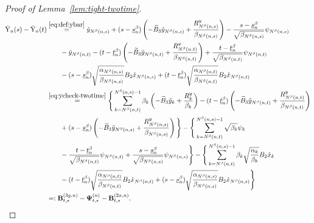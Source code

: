\documentclass[11pt]{article}
\theoremstyle{plain}
\theoremstyle{definition}
\newcommand{\xcheck}{{\check{x}}}
\newcommand{\ycheck}{{\check{y}}}
\newcommand{\ybar}{{\bar{\textnormal{Y}}}}
\newcommand{\ssum}[3]{\sum\limits_{{#1}={#2}}^{#3}}
\def\Psii{\mbox{\boldmath$\Psi$\unboldmath}}
\def\bfB{{\bf B}}
\begin{document}
\begin{appendix}
\begin{proof}[Proof of Lemma~\ref{lem:tight-twotime}]
\begin{align*}
    \ybar_{n}(s) - \ybar_{n}(t)
    & \overset{\eqref{eq:def:ybar}}{=} \ycheck_{N^\beta(n,s)} + (s - \underline{s}^\beta_{n} ) \left( - \widetilde{B}_3  \ycheck_{N^\beta(n,s)} + \frac{ R_{N^\beta(n,s)}^y }{ \beta_{N^\beta(n,s)} } \right) -  \frac{s - \underline{s}^\beta_{n}}{ \sqrt{ \beta_{N^\beta(n,s) } } }  
    \psi_{N^\beta(n,s)} \\
    & \qquad - \ycheck_{N^\beta(n,t)} - (t - \underline{t}^\beta_{n} ) \left( - \widetilde{B}_3 \ycheck_{N^\beta(n,t)} + \frac{ R_{N^\beta(n,t)}^y }{ \beta_{N^\beta(n,t)} } \right) +  \frac{t - \underline{t}^\beta_{n}}{ \sqrt{ \beta_{N^\beta(n,t)} } }
    \psi_{N^\beta(n,t)} \\
    & \qquad - (s - \underline{s}^\beta_{n}) \sqrt{ \frac{ \alpha_{N^\beta(n,s)} }{ \beta_{N^\beta(n,s)} } } B_2 \xcheck_{N^\beta(n,s)} 
    + (t - \underline{t}^\beta_{n}) \sqrt{ \frac{ \alpha_{N^\beta(n,t)} }{ \beta_{N^\beta(n,t)} } } B_2 \xcheck_{N^\beta(n,t)} \\
    & \overset{\eqref{eq:ycheck-twotime}}{=} \Bigg\{ \ssum{k}{N^\beta(n,t)}{N^\beta(n,s)-1} \beta_{k} \left( - \widetilde{B}_3 \ycheck_{k} + \frac{R_{k}^y}{\beta_{k}} \right) - (t - \underline{t}^\beta_{n} ) \left( - \widetilde{B}_3 \ycheck_{N^\beta(n,t)} + \frac{ R_{N^\beta(n,t)}^y }{ \beta_{N^\beta(n,t)} } \right) \\  
    & \qquad+ (s - \underline{s}^\beta_{n} ) \left( - \widetilde{B}_3 \ycheck_{N^\beta(n,s)} + \frac{ R_{N^\beta(n,s)}^y }{ \beta_{N^\beta(n,s)} } \right) \Bigg\}  - \Bigg\{ \ssum{k}{N^\beta(n,t)}{N^\beta(n,s)-1} \sqrt{\beta_{k}} \psi_{k} \\
    & \qquad -  \frac{t - \underline{t}^\beta_{n}}{ \sqrt{\beta_{N^\beta(n,t)} } } \psi_{N^\beta(n,t)} 
    + \frac{s - \underline{s}^\beta_{n}}{ \sqrt{\beta_{N^\beta(n,s)} } } \psi_{N^\beta(n,s)} \Bigg\}
    - \Bigg\{ \ssum{k}{N^\beta(n,t)}{N^\beta(n,s)-1} \beta_{k} \sqrt{ \frac{\alpha_{k}}{\beta_{k}} } B_2 \xcheck_{k} \\
    & \qquad  - (t - \underline{t}^\beta_{n}) \sqrt{ \frac{ \alpha_{N^\beta(n,t)} }{ \beta_{N^\beta(n,t)} } } B_2 \xcheck_{N^\beta(n,t)} + (s - \underline{s}^\beta_{n}) \sqrt{ \frac{ \alpha_{N^\beta(n,s)} }{ \beta_{N^\beta(n,s)} } } B_2 \xcheck_{N^\beta(n,s)} 
    \Bigg\} \\
    & =: \bfB^{(3y,n)}_{t,s} - \Psii^{(n)}_{t,s} - \bfB^{(2x,n)}_{t,s}.
\end{align*}


\end{proof}
\end{appendix}
\end{document}
